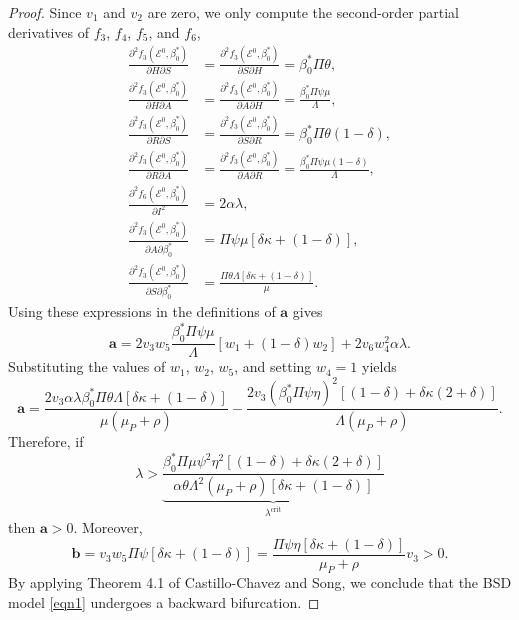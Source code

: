 \documentclass[10pt,a4paper]{amsart}
\newcommand\bfa{\mathbf{a}}
\newcommand\bfb{\mathbf{b}}
\begin{document}
\begin{proof}
    Since $v_1$ and $v_2$ are zero, we only compute the second-order partial derivatives of $f_3$, $f_4$, $f_5$,  and $f_6$,
    \begin{align*}
        \frac{\partial^2f_3(\mathcal{E}^0,\beta_0^*)}{\partial H\partial S}&=\frac{\partial^2f_3(\mathcal{E}^0,\beta_0^*)}{\partial S\partial H}=\beta_0^*\Pi\theta,\\
        \frac{\partial^2f_3(\mathcal{E}^0,\beta_0^*)}{\partial H\partial A}&=\frac{\partial^2f_3(\mathcal{E}^0,\beta_0^*)}{\partial A\partial H}=\frac{\beta_0^*\Pi\psi\mu}{\Lambda},\\
        \frac{\partial^2f_3(\mathcal{E}^0,\beta_0^*)}{\partial R\partial S}&=\frac{\partial^2f_3(\mathcal{E}^0,\beta_0^*)}{\partial S\partial R}=\beta_0^*\Pi\theta(1-\delta),\\
        \frac{\partial^2f_3(\mathcal{E}^0,\beta_0^*)}{\partial R\partial A}&=\frac{\partial^2f_3(\mathcal{E}^0,\beta_0^*)}{\partial A\partial R}=\frac{\beta_0^*\Pi\psi\mu(1-\delta)}{\Lambda},\\
        \frac{\partial^2f_6(\mathcal{E}^0,\beta_0^*)}{\partial I^2}&=2\alpha\lambda,\\
        \frac{\partial^2f_3(\mathcal{E}^0,\beta_0^*)}{\partial A\partial\beta_0^*}&=\Pi\psi\mu[\delta\kappa+(1-\delta)],\\
        \frac{\partial^2f_3(\mathcal{E}^0,\beta_0^*)}{\partial S\partial\beta_0^*}&=\frac{\Pi\theta\Lambda[\delta\kappa+(1-\delta)]}{\mu}.
    \end{align*}
    Using these expressions in the definitions of $\bfa$ gives 
    \begin{equation}
        \bfa=2v_3w_5\frac{\beta_0^*\Pi\psi\mu}{\Lambda}\left[w_1+(1-\delta)w_2\right]+2v_6w_4^2\alpha\lambda.
    \end{equation}
    Substituting the values of $w_1$, $w_2$, $w_5$, and setting $w_4=1$ yields
    \begin{equation}
        \bfa=\frac{2v_3\alpha\lambda\beta_0^*\Pi\theta\Lambda[\delta\kappa+(1-\delta)]}{\mu(\mu_P+\rho)}-\frac{2v_3(\beta_0^*\Pi\psi\eta)^2[(1-\delta)+\delta\kappa(2+\delta)]}{\Lambda(\mu_P+\rho)}.
    \end{equation}
    Therefore, if 
    \begin{equation}\label{eqn12}
        \lambda>\underbrace{\frac{\beta_0^*\Pi\mu\psi^2\eta^2[(1-\delta)+\delta\kappa(2+\delta)]}{\alpha\theta\Lambda^2(\mu_P+\rho)[\delta\kappa+(1-\delta)]}}_{\lambda^{\text{crit}}}
    \end{equation}
    then $\bfa>0$. Moreover, 
    \begin{equation}
        \bfb=v_3w_5\Pi\psi[\delta\kappa+(1-\delta)]=\frac{\Pi\psi\eta[\delta\kappa+(1-\delta)]}{\mu_P+\rho}v_3>0.
    \end{equation}
    By applying Theorem 4.1 of Castillo-Chavez and Song, we conclude that the BSD model \eqref{eqn1} undergoes a backward bifurcation. 
    \end{proof}
\end{document}
